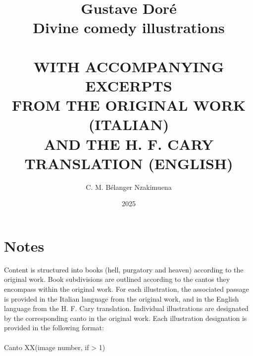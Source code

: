 \documentclass[a4paper,12pt,]{book}
\newcommand\tab[1][1cm]{\hspace*{#1}}
\begin{document}
\title{ 
\Huge{\textbf{Gustave Doré \protect\\ Divine comedy illustrations}} \\~\\
\small{\uppercase{with accompanying excerpts \protect\\ from the original work (Italian) \protect\\ and the H. F. Cary translation (English)}}
} %
\author{C. M. Bélanger Nzakimuena}
\date{2025} %
\maketitle

\setlength\parindent{0pt} %
\let\cleardoublepage\clearpage %

\frontmatter
\tableofcontents %

\chapter*{Notes}
Content is structured into books (hell, purgatory and heaven) according to the original work. Book subdivisions are outlined according to the cantos they encompass within the original work. For each illustration, the associated passage is provided in the Italian language from the original work, and in the English language from the H. F. Cary translation. Individual illustrations are designated by the corresponding canto in the original work. Each illustration designation is provided in the following format: \\~\\
\tab\tab\tab\tab Canto XX(\textquotesingle image number\textquotesingle, if > 1)

\mainmatter
\end{document}
